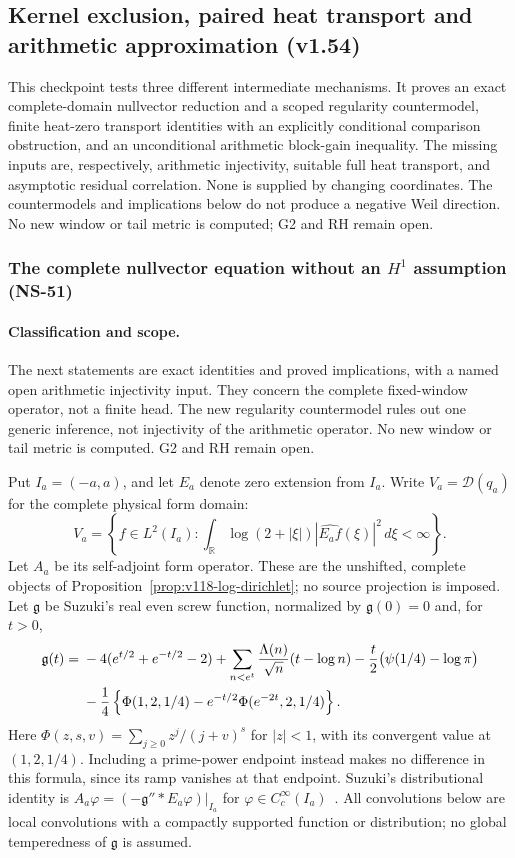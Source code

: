 \documentclass[11pt]{article}
\theoremstyle{remark}
\begin{document}
\subsection{Kernel exclusion, paired heat transport and arithmetic approximation (v1.54)}
\label{sec:v154-new-shapes}
This checkpoint tests three different intermediate mechanisms. It proves an
exact complete-domain nullvector reduction and a scoped regularity countermodel,
finite heat-zero transport identities with an explicitly conditional comparison
obstruction, and an unconditional arithmetic block-gain inequality. The missing
inputs are, respectively, arithmetic injectivity, suitable full heat transport,
and asymptotic residual correlation. None is supplied by changing coordinates.
The countermodels and implications below do not produce a negative Weil
direction. No new window or tail metric is computed; G2 and RH remain open.

\subsubsection*{The complete nullvector equation without an $H^1$ assumption (NS-51)}

\paragraph{Classification and scope.}
The next statements are exact identities and proved implications, with a
named open arithmetic injectivity input. They concern the complete
fixed-window operator, not a finite head. The new regularity countermodel
rules out one generic inference, not injectivity of the arithmetic
operator. No new window or tail metric is computed. G2 and RH remain open.

Put $I_a=(-a,a)$, and let $E_a$ denote zero extension from $I_a$.
Write $V_a=\mathcal D(q_a)$ for the complete physical form domain:
\[
 V_a=\left\{f\in L^2(I_a):
  \int_{\mathbb R}\log(2+|\xi|)|\widehat{E_af}(\xi)|^2\,d\xi<\infty\right\}.
\]
Let $A_a$ be its self-adjoint form operator. These are the unshifted,
complete objects of Proposition~\ref{prop:v118-log-dirichlet}; no source
projection is imposed. Let $\mathfrak g$ be Suzuki's real even screw
function, normalized by $\mathfrak g(0)=0$ and, for $t>0$,
\begin{align}
 \mathfrak g(t)={}&-4(e^{t/2}+e^{-t/2}-2)
  +\sum_{n<e^t}\frac{\Lambda(n)}{\sqrt n}(t-\log n)
  -\frac t2\bigl(\psi(1/4)-\log\pi\bigr)\notag\\
 &-\frac14\left\{\Phi(1,2,1/4)
             -e^{-t/2}\Phi(e^{-2t},2,1/4)\right\}.
 \label{eq:ns51-screw}
\end{align}
Here $\Phi(z,s,v)=\sum_{j\ge0}z^j/(j+v)^s$ for $|z|<1$,
with its convergent value at $(1,2,1/4)$. Including a prime-power
endpoint instead makes no difference in this formula, since its ramp
vanishes at that endpoint. Suzuki's distributional identity is
$A_a\varphi=(-\mathfrak g''*E_a\varphi)|_{I_a}$ for
$\varphi\in C_c^\infty(I_a)$~\cite[Sections 2.5 and 3]{Suzuki2026}.
All convolutions below are local convolutions with a compactly supported
function or distribution; no global temperedness of $\mathfrak g$ is
assumed.
\end{document}
